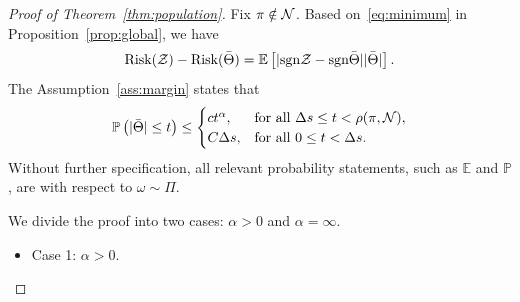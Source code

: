 \documentclass[twoside,11pt]{article}
\theoremstyle{plain}
\theoremstyle{definition}
\def\sign{\textup{sgn}}
\def\risk{\textup{Risk}}
\begin{document}
\begin{proof}[Proof of Theorem~\ref{thm:population}]
Fix $\pi\notin\mathcal{N}$. Based on~\eqref{eq:minimum} in Proposition~\ref{prop:global}, we have
\begin{equation}\label{eq:population2}
\risk(\tZ)- \risk(\bar \Theta) = \mathbb{E}\left[|\sign \tZ-\sign\bar \Theta||\bar \Theta|\right].
\end{equation}
The Assumption~\ref{ass:margin} states that
\begin{align}\label{eq:ass}
\mathbb{P}\left(|\bar \Theta | \leq t\right) \leq 
\begin{cases}ct^\alpha, & \text{for all } \Delta s \leq t< \rho(\pi,\mathcal{N}),\\
C\Delta s, & \text{for all }0\leq t< \Delta s.
\end{cases}
\end{align}
Without further specification, all relevant probability statements, such as $\mathbb{E}$ and $\mathbb{P}$, are with respect to $\omega\sim \Pi$. 

We divide the proof into two cases: $\alpha >0$ and $\alpha = \infty$.
\begin{itemize}[leftmargin=*,topsep=0pt,itemsep=-1ex,partopsep=1ex,parsep=1ex]
\item Case 1: $\alpha>0$. 


\end{itemize}
\end{proof}
\end{document}
